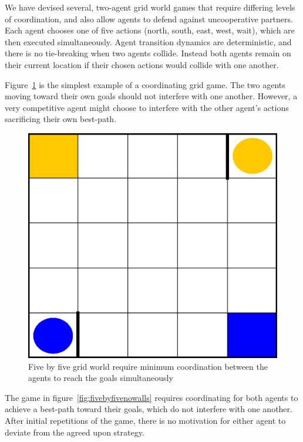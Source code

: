 \documentclass[letterpaper]{article}
\begin{document}
We have devised several, two-agent grid world games that require differing levels of coordination, and also allow agents to defend against uncooperative partners. Each agent chooses one of five actions (north, south, east, west, wait), which are then executed simultaneously. Agent transition dynamics are deterministic, and there is no tie-breaking when two agents collide. Instead both agents remain on their current location if their chosen actions would collide with one another.


Figure~\ref{fig:fivebyfivehardwalls} is the simplest example of a coordinating grid game. The two agents moving toward their own goals should not interfere with one another. However, a very competitive agent might choose to interfere with the other agent's actions sacrificing their own best-path.

\begin{figure}
\centering
\includegraphics[width=0.8\columnwidth]{figures/fivebyfivehardwalls.png}
\caption{Five by five grid world require minimum coordination between the agents to reach the goals simultaneously}
\label{fig:fivebyfivehardwalls}
\end{figure}

The game in figure~\ref{fig:fivebyfivenowalls} requires coordinating for both agents to achieve a best-path toward their goals, which do not interfere with one another. After initial repetitions of the game, there is no motivation for either agent to deviate from the agreed upon strategy.
\end{document}
